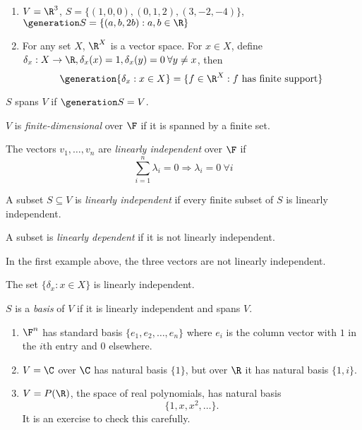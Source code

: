 \documentclass[a4paper]{article}
\newcommand*{\spans}{\generation}
\theoremstyle{definition}
\begin{document}
\begin{eg}\leavevmode
  \begin{enumerate}
 \item $V=\R^3$, $S = \{(1,0,0),(0,1,2),(3,-2,-4)\}$, $\spans S = \{(a,b,2b): a,b\in \R \}$
 \item For any set $X$, $\R^X$ is a vector space. For $x \in X$, define $\delta_x: X \to \R, \delta_x(x) = 1, \delta_x(y) = 0 \: \forall y \neq x$, then
   \[
     \spans{\delta_x: x\in X} = \{f\in \R^X: f \text{ has finite support} \}
   \]
  \end{enumerate} 
\end{eg}

\begin{definition}[Span]
  $S$ spans $V$ if $\spans S = V$.
\end{definition}

\begin{definition}
  $V$ is \emph{finite-dimensional} over $\F$ if it is spanned by a finite set.
\end{definition}

\begin{definition}
  The vectors $v_1,\ldots, v_n$ are \emph{linearly independent} over $\F$ if
  \[
    \sum_{i=1}^n \lambda_i = 0 \Rightarrow \lambda_i = 0 \: \forall i
  \]

  A subset $S \subseteq V$ is \emph{linearly independent} if every finite subset of $S$ is linearly independent.

  A subset is \emph{linearly dependent} if it is not linearly independent.
\end{definition}

\begin{eg}
  In the first example above, the three vectors are not linearly independent.
\end{eg}

\begin{ex}
  The set $\{\delta_x: x \in X\}$ is linearly independent.
\end{ex}

\begin{definition}[Basis]
  $S$ is a \emph{basis} of $V$ if it is linearly independent and spans $V$.
\end{definition}

\begin{eg}\leavevmode
  \begin{enumerate}
  \item $\F^n$ has standard basis $\{e_1,e_2,\ldots,e_n\}$ where $e_i$ is the column vector with $1$ in the $i$th entry and $0$ elsewhere.
  \item $V=\C$ over $\C$ has natural basis $\{1\}$, but over $\R$ it has natural basis $\{1, i\}$.
  \item $V=P(\R)$, the space of real polynomials, has natural basis
    \[
      \{1, x, x^2, \dots \}.
    \]
    It is an exercise to check this carefully.
    \end{enumerate}
\end{eg}
\end{document}
